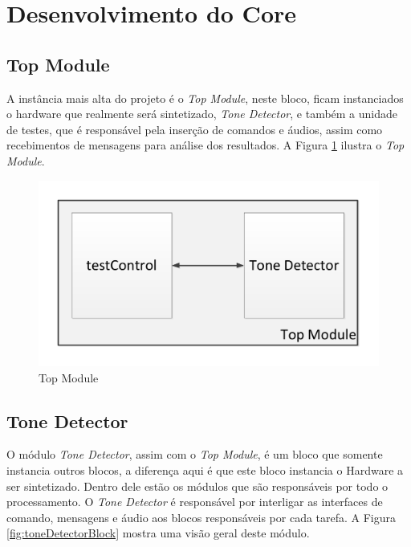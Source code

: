 \documentclass[monografia]{subfiles}
\begin{document}
\section{Desenvolvimento do Core}

	\subsection{Top Module}
		A instância mais alta do projeto é o \textit{Top Module}, neste bloco, ficam instanciados o hardware que realmente será sintetizado,
		\textit{Tone Detector}, e também a unidade de testes, que é responsável pela inserção de comandos e áudios, assim como recebimentos
		de mensagens para análise dos resultados. A Figura \ref{fig:topModuleBlock} ilustra o \textit{Top Module}.


			\begin{figure}[!h]
			\centering 
			\includegraphics[scale=0.5]{img/modulos/mod_topModule.pdf}
			\caption{Top Module}
			\label{fig:topModuleBlock}
			\end{figure}

	\subsection{Tone Detector}
		O módulo \textit{Tone Detector}, assim com o \textit{Top Module}, é um bloco que somente instancia outros blocos, a diferença aqui é
		que este bloco instancia o Hardware a ser sintetizado. Dentro dele estão os módulos que são responsáveis por todo o processamento.
		O \textit{Tone Detector} é responsável por interligar as interfaces de comando, mensagens e áudio aos blocos responsáveis por cada 
		tarefa. A Figura \ref{fig:toneDetectorBlock} mostra uma visão geral deste módulo.
\end{document}

